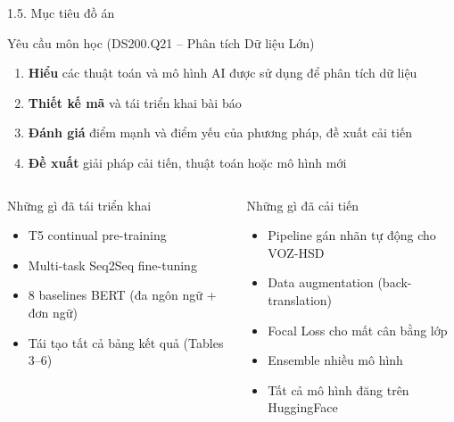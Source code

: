 \documentclass[11pt, aspectratio=169]{beamer}
\begin{document}
\begin{frame}[fragile, shrink=8]{1.5. Mục tiêu đồ án}

\begin{block}{Yêu cầu môn học (DS200.Q21 -- Phân tích Dữ liệu Lớn)}
  \begin{enumerate}
    \item \textbf{Hiểu} các thuật toán và mô hình AI được sử dụng để phân tích dữ liệu
    \item \textbf{Thiết kế mã} và tái triển khai bài báo
    \item \textbf{Đánh giá} điểm mạnh và điểm yếu của phương pháp, đề xuất cải tiến
    \item \textbf{Đề xuất} giải pháp cải tiến, thuật toán hoặc mô hình mới
  \end{enumerate}
\end{block}

\vspace{0.3cm}
\begin{columns}[T]
  \begin{block}{Những gì đã tái triển khai}
    \begin{itemize}
      \item T5 continual pre-training
      \item Multi-task Seq2Seq fine-tuning
      \item 8 baselines BERT (đa ngôn ngữ + đơn ngữ)
      \item Tái tạo tất cả bảng kết quả (Tables 3--6)
    \end{itemize}
  \end{block}

  \begin{block}{Những gì đã cải tiến}
    \begin{itemize}
      \item Pipeline gán nhãn tự động cho VOZ-HSD
      \item Data augmentation (back-translation)
      \item Focal Loss cho mất cân bằng lớp
      \item Ensemble nhiều mô hình
      \item Tất cả mô hình đăng trên HuggingFace
    \end{itemize}
  \end{block}
\end{columns}
\end{frame}
\end{document}
